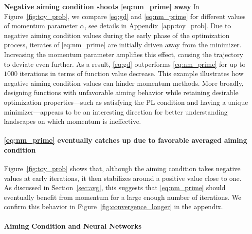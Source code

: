 \documentclass{article}
\newcommand{\jh}[1]{{\color{red} #1}}
\def\pl{{\text{PL}^\mu}}
\theoremstyle{plain}
\theoremstyle{definition}
\theoremstyle{remark}
\begin{document}
\noindent
\textbf{Negative aiming condition shoots \eqref{eq:nm_prime} away \:} In Figure~\ref{fig:toy_prob}, we compare \eqref{eq:gd} and \eqref{eq:nm_prime} for different values of momentum parameter $\alpha$, see details in Appendix~\ref{app:toy_prob}. Due to negative aiming condition values during the early phase of the optimization process, iterates of \eqref{eq:nm_prime} are initially driven away from the minimizer. Increasing the momentum parameter amplifies this effect, causing the trajectory to deviate even further. 
As a result, \eqref{eq:gd} outperforms \eqref{eq:nm_prime} for up to $1000$ iterations in terms of function value decrease. This example illustrates how negative aiming condition values can hinder momentum methods. 
More broadly, designing functions with unfavorable aiming behavior while retaining desirable optimization properties—such as satisfying the PL condition and having a unique minimizer—appears to be an interesting direction for better understanding landscapes on which momentum is ineffective.

\paragraph{\eqref{eq:nm_prime} eventually catches up due to favorable averaged aiming condition \:}
Figure~\ref{fig:toy_prob} shows that, although the aiming condition takes negative values at early iterations, it then stabilizes around a positive value close to one. As discussed in Section~\ref{sec:avg}, this suggests that \eqref{eq:nm_prime} should eventually benefit from momentum for a large enough number of iterations. We confirm this behavior in Figure~\ref{fig:convergence_longer} in the appendix.

\paragraph{Aiming Condition and Neural Networks}
\end{document}
